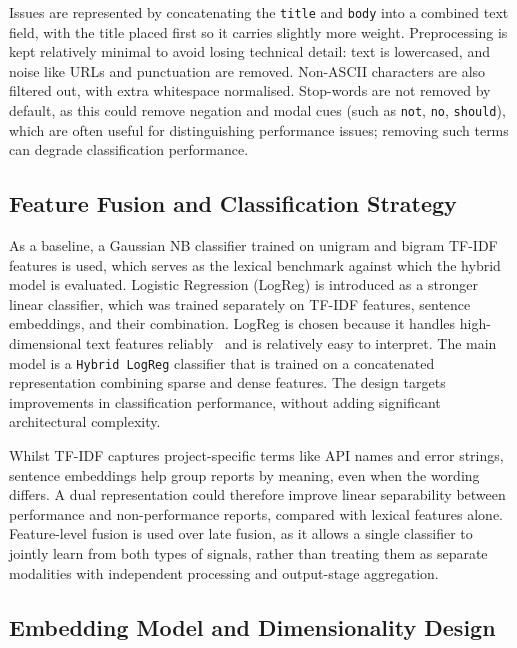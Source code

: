 \documentclass[10pt,a4paper]{article}
\begin{document}
Issues are represented by concatenating the \texttt{title} and \texttt{body} into a combined text field, with the title placed first so it carries slightly more weight. Preprocessing is kept relatively minimal to avoid losing technical detail: text is lowercased, and noise like URLs and punctuation are removed. Non-ASCII characters are also filtered out, with extra whitespace normalised. Stop-words are not removed by default, as this could remove negation and modal cues (such as \texttt{not}, \texttt{no}, \texttt{should}), which are often useful for distinguishing performance issues; removing such terms can degrade classification performance.


\subsection{Feature Fusion and Classification Strategy}\label{feature-fusion-classification}

As a baseline, a Gaussian NB classifier trained on unigram and bigram TF-IDF features is used, which serves as the lexical benchmark against which the hybrid model is evaluated. Logistic Regression (LogReg) is introduced as a stronger linear classifier, which was trained separately on TF-IDF features, sentence embeddings, and their combination. LogReg is chosen because it handles high-dimensional text features reliably~\cite{fan2008liblinear} and is relatively easy to interpret. The main model is a \texttt{Hybrid LogReg} classifier that is trained on a concatenated representation combining sparse and dense features. The design targets improvements in classification performance, without adding significant architectural complexity.


Whilst TF-IDF captures project-specific terms like API names and error strings, sentence embeddings help group reports by meaning, even when the wording differs. A dual representation could therefore improve linear separability between performance and non-performance reports, compared with lexical features alone. Feature-level fusion is used over late fusion, as it allows a single classifier to jointly learn from both types of signals, rather than treating them as separate modalities with independent processing and output-stage aggregation.


\subsection{Embedding Model and Dimensionality Design}\label{embedding-model-dimensionality}
\end{document}
